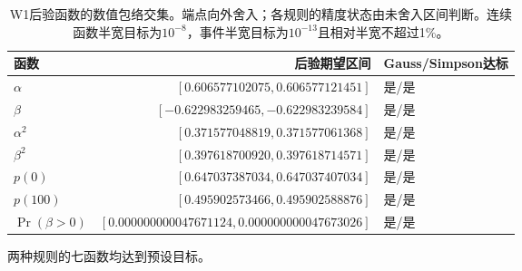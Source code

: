 \begin{table}[htbp]\centering\small
\begin{tabular}{lrl}\toprule
函数 & 后验期望区间 & Gauss/Simpson达标\\\midrule
$\alpha$ & $[0.606577102075, 0.606577121451]$ & 是/是\\
$\beta$ & $[-0.622983259465, -0.622983239584]$ & 是/是\\
$\alpha^2$ & $[0.371577048819, 0.371577061368]$ & 是/是\\
$\beta^2$ & $[0.397618700920, 0.397618714571]$ & 是/是\\
$p(0)$ & $[0.647037387034, 0.647037407034]$ & 是/是\\
$p(100)$ & $[0.495902573466, 0.495902588876]$ & 是/是\\
$\Pr(\beta>0)$ & $[0.000000000047671124, 0.000000000047673026]$ & 是/是\\
\bottomrule\end{tabular}
\caption{W1后验函数的数值包络交集。端点向外舍入；各规则的精度状态由未舍入区间判断。连续函数半宽目标为$10^{-8}$，事件半宽目标为$10^{-13}$且相对半宽不超过1\%。}
\label{tab:w1-enclosure}\end{table}
两种规则的七函数均达到预设目标。
